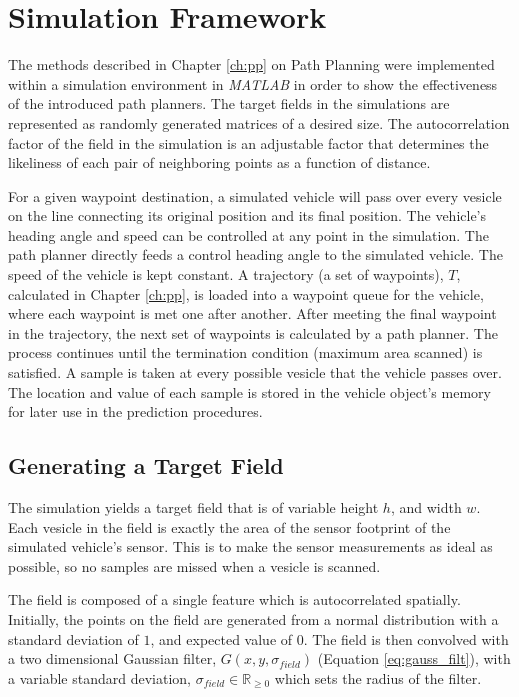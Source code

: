 \chapter{Simulation Framework}
The methods described in Chapter \ref{ch:pp} on Path Planning were implemented within a simulation environment in \textit{MATLAB} in order to show the effectiveness of the introduced path planners. The target fields in the simulations are represented as randomly generated matrices of a desired size. The autocorrelation factor of the field in the simulation is an adjustable factor that determines the likeliness of each pair of neighboring points as a function of distance. 

For a given waypoint destination, a simulated vehicle will pass over every vesicle on the line connecting its original position and its final position. The vehicle's heading angle and speed can be controlled at any point in the simulation. The path planner directly feeds a control heading angle to the simulated vehicle. The speed of the vehicle is kept constant. A trajectory (a set of waypoints), $T$, calculated in Chapter \ref{ch:pp}, is loaded into a waypoint queue for the vehicle, where each waypoint is met one after another. After meeting the final waypoint in the trajectory, the next set of waypoints is calculated by a path planner. The process continues until the termination condition (maximum area scanned) is satisfied. A sample is taken at every possible vesicle that the vehicle passes over. The location and value of each sample is stored in the vehicle object's memory for later use in the prediction procedures.

\section{Generating a Target Field}
The simulation yields a target field that is of variable height $h$, and width $w$. Each vesicle in the field is exactly the area of the sensor footprint of the simulated vehicle's sensor. This is to make the sensor measurements as ideal as possible, so no samples are missed when a vesicle is scanned.

The field is composed of a single feature which is autocorrelated spatially. Initially, the points on the field are generated from a normal distribution with a standard deviation of $1$, and expected value of $0$. The field is then convolved with a two dimensional Gaussian filter, $G(x,y,\sigma_{field})$ (Equation \ref{eq:gauss_filt}), with a variable standard deviation, $\sigma_{field} \in \mathbb{R}_{\geq 0}$ which sets the radius of the filter. 

